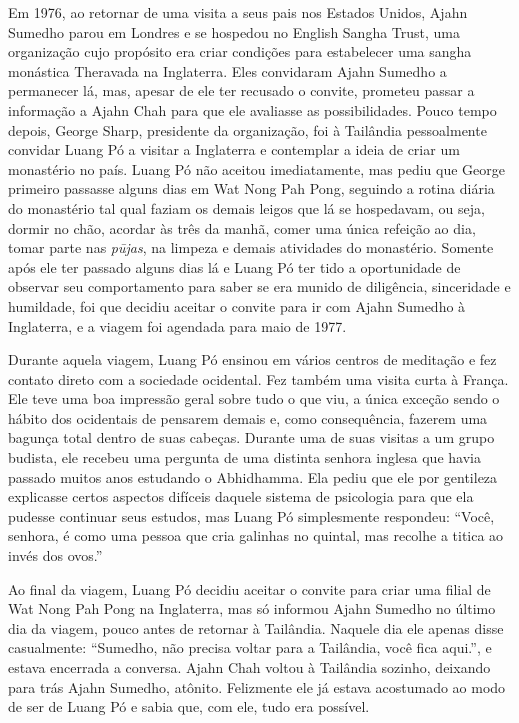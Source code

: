 Em 1976, ao retornar de uma visita a seus pais nos Estados Unidos, Ajahn
Sumedho parou em Londres e se hospedou no English Sangha Trust, uma
organização cujo propósito era criar condições para estabelecer uma
sangha monástica Theravada na Inglaterra. Eles convidaram Ajahn Sumedho
a permanecer lá, mas, apesar de ele ter recusado o convite, prometeu
passar a informação a Ajahn Chah para que ele avaliasse as
possibilidades. Pouco tempo depois, George Sharp, presidente da
organização, foi à Tailândia pessoalmente convidar Luang Pó a visitar a
Inglaterra e contemplar a ideia de criar um monastério no país. Luang Pó
não aceitou imediatamente, mas pediu que George primeiro passasse alguns
dias em Wat Nong Pah Pong, seguindo a rotina diária do monastério tal
qual faziam os demais leigos que lá se hospedavam, ou seja, dormir no
chão, acordar às três da manhã, comer uma única refeição ao dia, tomar
parte nas \emph{pūjas}, na limpeza e demais atividades do monastério.
Somente após ele ter passado alguns dias lá e Luang Pó ter tido a
oportunidade de observar seu comportamento para saber se era munido de
diligência, sinceridade e humildade, foi que decidiu aceitar o convite
para ir com Ajahn Sumedho à Inglaterra, e a viagem foi agendada para
maio de 1977.

Durante aquela viagem, Luang Pó ensinou em vários centros de meditação e
fez contato direto com a sociedade ocidental. Fez também uma visita
curta à França. Ele teve uma boa impressão geral sobre tudo o que viu, a
única exceção sendo o hábito dos ocidentais de pensarem demais e, como
consequência, fazerem uma bagunça total dentro de suas cabeças. Durante
uma de suas visitas a um grupo budista, ele recebeu uma pergunta de uma
distinta senhora inglesa que havia passado muitos anos estudando o
Abhidhamma. Ela pediu que ele por gentileza explicasse certos aspectos
difíceis daquele sistema de psicologia para que ela pudesse continuar
seus estudos, mas Luang Pó simplesmente respondeu: ``Você, senhora, é
como uma pessoa que cria galinhas no quintal, mas recolhe a titica ao
invés dos ovos.''

Ao final da viagem, Luang Pó decidiu aceitar o convite para criar uma
filial de Wat Nong Pah Pong na Inglaterra, mas só informou Ajahn Sumedho
no último dia da viagem, pouco antes de retornar à Tailândia. Naquele
dia ele apenas disse casualmente: ``Sumedho, não precisa voltar para a
Tailândia, você fica aqui.'', e estava encerrada a conversa. Ajahn Chah
voltou à Tailândia sozinho, deixando para trás Ajahn Sumedho, atônito.
Felizmente ele já estava acostumado ao modo de ser de Luang Pó e sabia
que, com ele, tudo era possível.

